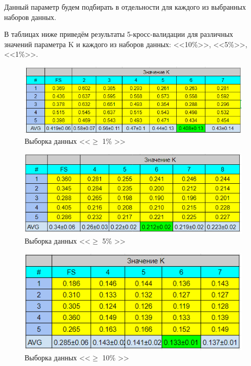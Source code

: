 Данный параметр будем подбирать в отдельности для каждого из выбранных наборов данных. 

В таблицах ниже приведём результаты 5-кросс-валидации для различных значений параметра K и каждого из наборов данных: <<10\%>>, <<5\%>>, <<1\%>>.

\begin{figure}[h!] 
  \center
  \includegraphics [scale=1.0] {images/1_percent_experience.png}
  \caption{ Выборка данных <<$\ge$ 1\% >>} 
  \label{fig:1_perc}  
\end{figure}


\begin{figure}[h!] 
  \center
  \includegraphics [scale=1.0] {images/5_percent_experience.png}
  \caption{ Выборка данных <<$\ge$ 5\% >>} 
  \label{fig:5_perc}  
\end{figure}


\begin{figure}[h!] 
  \center
  \includegraphics [scale=1.0] {images/10_percent_experience.png}
  \caption{ Выборка данных <<$\ge$ 10\% >>} 
  \label{fig:10_perc}  
\end{figure}


